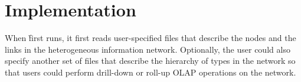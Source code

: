 \section{Implementation}
\label{sec:impl}

When \h first runs, it first reads user-specified files that describe
the nodes and the links in the heterogeneous information network.
Optionally, the user could also specify another set of files that
describe the hierarchy of types in the network so that users could
perform drill-down or roll-up OLAP operations on the network.
